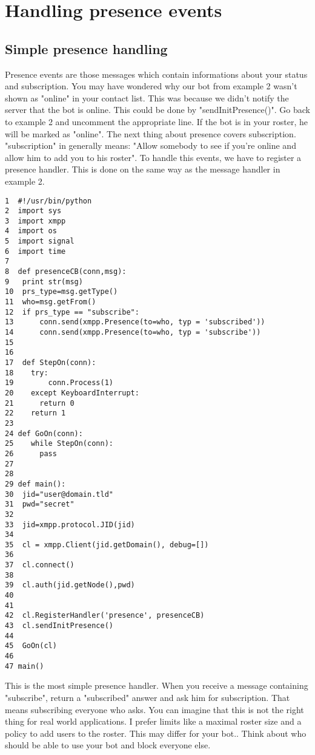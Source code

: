 \chapter{Handling presence events}

\section{Simple presence handling}

Presence events are those messages which contain informations about your status and subscription.
You may have wondered why our bot from example 2 wasn't shown as "online" in your contact list.
This was because we didn't notify the server that the bot is online. This could be done by "sendInitPresence()". Go back to example 2 and uncomment the appropriate line. If the bot is in your roster, he will be marked as "online".
\newline
\newline
The next thing about presence covers subscription. "subscription" in generally means: "Allow somebody to see if you're online and allow him to add you to his roster".
To handle this events, we have to register a presence handler. This is done on the same way as the message handler in example 2.

\begin{verbatim}
1  #!/usr/bin/python
2  import sys
3  import xmpp
4  import os
5  import signal
6  import time
7
8  def presenceCB(conn,msg):
9	print str(msg)
10	prs_type=msg.getType()
11	who=msg.getFrom()
12	if prs_type == "subscribe":
13		conn.send(xmpp.Presence(to=who, typ = 'subscribed'))
14		conn.send(xmpp.Presence(to=who, typ = 'subscribe'))
15
16
17  def StepOn(conn):
18    try:
19        conn.Process(1)
20    except KeyboardInterrupt:
21	    return 0
22    return 1
23
24 def GoOn(conn):
25    while StepOn(conn):
26	    pass
27
28
29 def main():
30	jid="user@domain.tld"
31	pwd="secret"
32
33	jid=xmpp.protocol.JID(jid)
34
35	cl = xmpp.Client(jid.getDomain(), debug=[])
36
37	cl.connect()
38
39	cl.auth(jid.getNode(),pwd)
40
41
42	cl.RegisterHandler('presence', presenceCB)
43	cl.sendInitPresence()
44
45	GoOn(cl)
46
47 main()
\end{verbatim}
This is the most simple presence handler. When you receive a message containing "subscribe", return a "subscribed" answer and ask him for subscription. That means subscribing everyone who asks.
You can imagine that this is not the right thing for real world applications. I prefer limits like a maximal roster size and a policy to add users to the roster. This may differ for your bot..
\newline
Think about who should be able to use your bot and block everyone else.
\newpage
